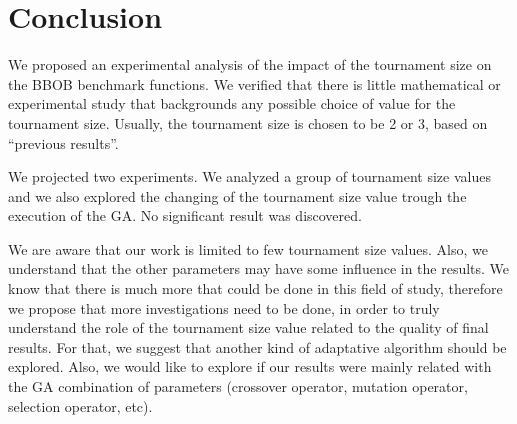 \section{Conclusion}
\label{sec:conclusion}


We proposed an experimental analysis of the impact of the tournament size on the BBOB benchmark functions. We verified that there is little mathematical or experimental study that backgrounds any possible choice of value for the tournament size. Usually, the tournament size is chosen to be 2 or 3, based on ``previous results''.
 
 
We projected two experiments. We analyzed a group of tournament size values and we also explored the changing of the tournament size value trough the execution of the GA. No significant result was discovered.

We are aware that our work is limited to few tournament size values. Also, we understand that the other parameters may have some influence in the results. We know that there is much more that could be done in this field of study, therefore we propose that more investigations need to be done, in order to truly understand the role of the tournament size value related to the quality of final results. For that, we suggest that another kind of adaptative algorithm should be explored. Also, we would like to explore if our results were mainly related with the GA combination of parameters (crossover operator, mutation operator, selection operator, etc).

